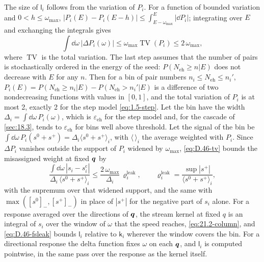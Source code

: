 The size of $\mathsf{l}_i$ follows from the variation of $P_i$. For a function of bounded variation and $0 < h \le \omega_{\mathrm{max}}$, $|P_i(E) - P_i(E - h)| \le \int_{E-\omega_{\mathrm{max}}}^{E}|\dd P_i|$; integrating over $E$ and exchanging the integrals gives
\begin{equation}
  \int\dd\omega\,|\Delta P_i(\omega)| \le \omega_{\mathrm{max}}\operatorname{TV}(P_i) \le 2\,\omega_{\mathrm{max}} ,
  \label{eq:D.46-tv}
\end{equation}
where $\operatorname{TV}$ is the total variation. The last step assumes that the number of pairs is stochastically ordered in the energy of the seed: $P(N_{\mathrm{eh}} \ge n|E)$ does not decrease with $E$ for any $n$. Then for a bin of pair numbers $n_i \le N_{\mathrm{eh}} \le n_i'$, $P_i(E) = P(N_{\mathrm{eh}} \ge n_i|E) - P(N_{\mathrm{eh}} > n_i'|E)$ is a difference of two nondecreasing functions with values in $[0, 1]$, and the total variation of $P_i$ is at most 2, exactly 2 for the step model \cref{eq:1.5-step}. Let the bin have the width $\Delta_i = \int\dd\omega\,P_i(\omega)$, which is $\varepsilon_{\mathrm{eh}}$ for the step model and, for the cascade of \cref{sec:18.3}, tends to $\varepsilon_{\mathrm{eh}}$ for bins well above threshold. Let the signal of the bin be $\int\dd\omega\,P_i(s^0 + s^+) = \Delta_i\langle s^0 + s^+\rangle_i$, with $\langle\,\rangle_i$ the average weighted with $P_i$. Since $\Delta P_i$ vanishes outside the support of $P_i$ widened by $\omega_{\mathrm{max}}$, \cref{eq:D.46-tv} bounds the misassigned weight at fixed $\bm{q}$ by
\begin{equation}
  \frac{\int\dd\omega\,|s_i - s_i^{\mathrm{c}}|}{\Delta_i\,\langle s^0 + s^+\rangle_i} \le \frac{2\,\omega_{\mathrm{max}}}{\Delta_i}\,\varrho^{\mathrm{leak}}_i , \qquad
  \varrho^{\mathrm{leak}}_i = \frac{\sup|s^+|}{\langle s^0 + s^+\rangle_i} ,
  \label{eq:D.46-fsleak}
\end{equation}
with the supremum over that widened support,
and the same with $\max([s^0]_-, [s^+]_-)$ in place of $|s^+|$ for the negative part of $s_i$ alone. For a response averaged over the directions of $\bm{q}$, the stream kernel at fixed $q$ is an integral of $s_i$ over the window of $\omega$ that the speed reaches, \cref{eq:21.2-column}, and \cref{eq:D.46-fsleak} bounds $\mathsf{l}_i$ relative to $\mathsf{k}_i$ wherever the window covers the bin. For a directional response the delta function fixes $\omega$ on each $\bm{q}$, and $\mathsf{l}_i$ is computed pointwise, in the same pass over the response as the kernel itself.

